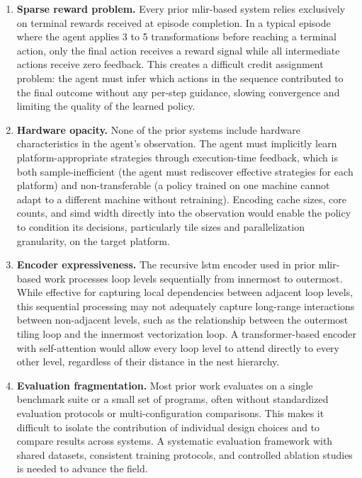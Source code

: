 \begin{enumerate}
    \item \textbf{Sparse reward problem.} Every prior \gls{mlir}-based system relies exclusively on terminal rewards received at episode completion. In a typical episode where the agent applies 3 to 5 transformations before reaching a terminal action, only the final action receives a reward signal while all intermediate actions receive zero feedback. This creates a difficult credit assignment problem: the agent must infer which actions in the sequence contributed to the final outcome without any per-step guidance, slowing convergence and limiting the quality of the learned policy.

    \item \textbf{Hardware opacity.} None of the prior systems include hardware characteristics in the agent's observation. The agent must implicitly learn platform-appropriate strategies through execution-time feedback, which is both sample-inefficient (the agent must rediscover effective strategies for each platform) and non-transferable (a policy trained on one machine cannot adapt to a different machine without retraining). Encoding cache sizes, core counts, and \gls{simd} width directly into the observation would enable the policy to condition its decisions, particularly tile sizes and parallelization granularity, on the target platform.

    \item \textbf{Encoder expressiveness.} The recursive \gls{lstm} encoder used in prior \gls{mlir}-based work processes loop levels sequentially from innermost to outermost. While effective for capturing local dependencies between adjacent loop levels, this sequential processing may not adequately capture long-range interactions between non-adjacent levels, such as the relationship between the outermost tiling loop and the innermost vectorization loop. A transformer-based encoder with self-attention would allow every loop level to attend directly to every other level, regardless of their distance in the nest hierarchy.

    \item \textbf{Evaluation fragmentation.} Most prior work evaluates on a single benchmark suite or a small set of programs, often without standardized evaluation protocols or multi-configuration comparisons. This makes it difficult to isolate the contribution of individual design choices and to compare results across systems. A systematic evaluation framework with shared datasets, consistent training protocols, and controlled ablation studies is needed to advance the field.
\end{enumerate}

